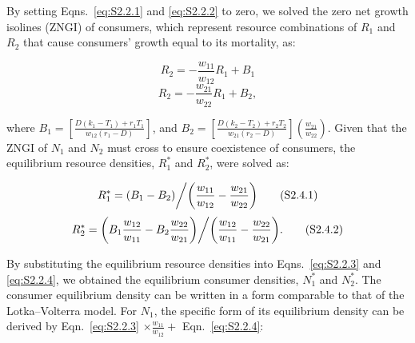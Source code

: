 By setting Eqns.~\ref{eq:S2.2.1} and \ref{eq:S2.2.2} to zero, we solved the zero net growth isolines (ZNGI) of consumers, which represent resource combinations of $R_{1}$ and $R_{2}$ that cause consumers' growth equal to its mortality, as:

\begin{equation}
R_2 =  - \frac{{{w_{11}}}}{{{w_{12}}}}R_1 + {B_1} 
\tag{S2.3.1}\label{eq:S2.3.1}
\end{equation}
\begin{equation}
R_2 =  - \frac{{{w_{21}}}}{{{w_{22}}}}R_1 + {B_2}, 
\tag{S2.3.2}\label{eq:S2.3.2}
\end{equation}

\noindent where ${B_1} = \left[ {\frac{{D\left( {{k_1} - {T_1}} \right) + {r_1}{T_1}}}{{{w_{12}}\left( {{r_1} - D} \right)}}} \right]$, and ${B_2} = \left[ {\frac{{D\left( {{k_2} - {T_2}} \right) + {r_2}{T_2}}}{{{w_{21}}\left( {{r_2} - D} \right)}}} \right]\left( {\frac{{{w_{21}}}}{{{w_{22}}}}} \right)$. Given that the ZNGI of $N_{1}$ and $N_{2}$ must cross to ensure coexistence of consumers, the equilibrium resource densities, $R_{1}^{*}$ and $R_{2}^{*}$, were solved as:

\begin{equation}
R_1^* = {{\left( {{B_1} - {B_2}} \right)} \mathord{\left/
		{\vphantom {{\left( {{B_1} - {B_2}} \right)} {\left( {\frac{{{w_{11}}}}{{{w_{12}}}} - \frac{{{w_{21}}}}{{{w_{22}}}}} \right)}}} \right.
		\kern-\nulldelimiterspace} {\left( {\frac{{{w_{11}}}}{{{w_{12}}}} - \frac{{{w_{21}}}}{{{w_{22}}}}} \right)}} 
\tag{S2.4.1}\label{eq:S2.4.1}
\end{equation}
\begin{equation}
R_2^* = {{\left( {{B_1}\frac{{{w_{12}}}}{{{w_{11}}}} - {B_2}\frac{{{w_{22}}}}{{{w_{21}}}}} \right)} \mathord{\left/
		{\vphantom {{\left( {{B_1}\frac{{{w_{12}}}}{{{w_{11}}}} - {B_2}\frac{{{w_{22}}}}{{{w_{21}}}}} \right)} {\left( {\frac{{{w_{21}}}}{{{w_{11}}}} - \frac{{{w_{22}}}}{{{w_{21}}}}} \right)}}} \right.
		\kern-\nulldelimiterspace} {\left( {\frac{{{w_{12}}}}{{{w_{11}}}} - \frac{{{w_{22}}}}{{{w_{21}}}}} \right)}}.
\tag{S2.4.2}\label{eq:S2.4.2}
\end{equation}

\noindent By substituting the equilibrium resource densities into Eqns.~\ref{eq:S2.2.3} and \ref{eq:S2.2.4}, we obtained the equilibrium consumer densities, $N_{1}^{*}$ and $N_{2}^{*}$. The consumer equilibrium density can be written in a form comparable to that of the Lotka--Volterra model. For $N_{1}$, the specific form of its equilibrium density can be derived by Eqn.~\ref{eq:S2.2.3} $\times \frac{w_{11}}{w_{12}} + $ Eqn.~\ref{eq:S2.2.4}:

